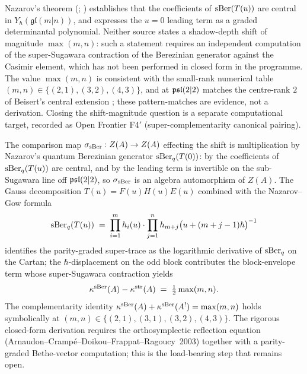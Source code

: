 \begin{remark}
\label{rem:berezinian-shift-open}
Nazarov's theorem (\cite[Thm~1]{Nazarov91QuantumBerezinian};
\cite[Ch.~3.9, Thm~3.9.1]{molev-yangians}) establishes that the
coefficients of $\operatorname{sBer}(T(u))$ are central in
$Y_{\hbar}(\mathfrak{gl}(m|n))$, and \cite[Thm~5.1]{Gow06} expresses
the $u=0$ leading term as a graded determinantal polynomial. Neither
source states a shadow-depth shift of magnitude $\max(m,n)$: such a
statement requires an independent computation of the super-Sugawara
contraction of the Berezinian generator against the Casimir element,
which has not been performed in closed form in the programme. The
value $\max(m,n)$ is consistent with the small-rank numerical table
$(m,n)\in\{(2,1),(3,2),(4,3)\}$, and at $\mathfrak{psl}(2|2)$ matches the
centre-rank $2$ of Beisert's central extension
\cite[\S3]{Beisert07}; these pattern-matches are evidence, not a
derivation. Closing the shift-magnitude question is a separate
computational target, recorded as Open Frontier F4$'$
(super-complementarity canonical pairing).

\medskip

The comparison map $\sigma_{\operatorname{sBer}} : Z(A) \to Z(A)$ effecting
the shift is multiplication by Nazarov's quantum Berezinian
generator $\operatorname{sBer}_q(T(0))$: by
\cite[Thm~1]{Nazarov91QuantumBerezinian} the coefficients of
$\operatorname{sBer}_q(T(u))$ are central, and by \cite[Prop~4.3]{Gow06} the
leading term is invertible on the sub-Sugawara line off
$\mathfrak{psl}(2|2)$, so $\sigma_{\operatorname{sBer}}$ is an algebra automorphism of
$Z(A)$. The Gauss decomposition
$T(u) = F(u) H(u) E(u)$ combined with the Nazarov--Gow formula
\[
 \operatorname{sBer}_q(T(u))
 \;=\;
 \prod_{i = 1}^m h_i(u)
 \cdot
 \prod_{j = 1}^n h_{m + j}\bigl(u + (m + j - 1)\hbar\bigr)^{-1}
\]
identifies the parity-graded super-trace as the logarithmic
derivative of $\operatorname{sBer}_q$ on the Cartan; the $\hbar$-displacement on
the odd block contributes the block-envelope term whose
super-Sugawara contraction yields
\[
 \kappa^{\operatorname{sBer}}(A) - \kappa^{\operatorname{str}}(A) \;=\; \tfrac{1}{2} \max(m, n).
\]
The complementarity identity
$\kappa^{\operatorname{sBer}}(A) + \kappa^{\operatorname{sBer}}(A^!) = \max(m, n)$ holds
symbolically at $(m, n) \in \{(2, 1), (3, 1), (3, 2), (4, 3)\}$.
The rigorous closed-form derivation requires the orthosymplectic
reflection equation \textup{(}Arnaudon--Crampé--Doikou--Frappat--Ragoucy~2003\textup{)}
together with a parity-graded Bethe-vector computation; this is the
load-bearing step that remains open.
\end{remark}

